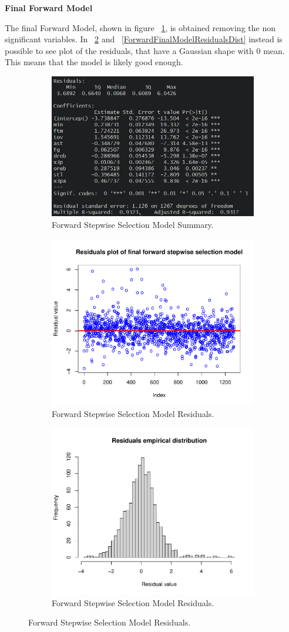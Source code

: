 \vspace{0.2cm}
\textbf{Final Forward Model}

The final Forward Model, shown in figure \Fig~\ref{fig:ForwardFinalModelSummary}, is obtained removing the non significant variables. In \Fig~\ref{fig:ForwardFinalModelResiduals} and \Fig~\ref{ForwardFinalModelResidualsDist} instead is possible to see plot of the residuals, that have a Gaussian shape with 0 mean. This means that the model is likely good enough.

\begin{figure}[h]
	\centering
	\begin{subfigure}{.6\textwidth}
		\centering
		\includegraphics[width=0.5\linewidth]{ImageFiles/Regression/Forward/ForwardFinalModelSummary}
		\caption{Forward Stepwise Selection Model Summary.}
		\label{fig:ForwardFinalModelSummary}
	\end{subfigure}
	\begin{subfigure}{.6\textwidth}
		\centering
		\includegraphics[width=0.5\linewidth]{ImageFiles/Regression/Forward/ForwardFinalModelResiduals}
		\caption{Forward Stepwise Selection Model Residuals.}
		\label{fig:ForwardFinalModelResiduals}
	\end{subfigure}%
	\begin{subfigure}{.6\textwidth}
		\centering
		\includegraphics[width=0.5\linewidth]{ImageFiles/Regression/Forward/ForwardFinalModelResidualsDist}
		\caption{Forward Stepwise Selection Model Residuals.}
		\label{fig:ForwardFinalModelResidualsDist}
	\end{subfigure}
\end{figure}

